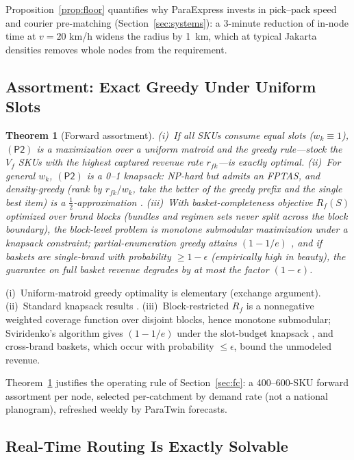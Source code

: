 \documentclass[journal]{IEEEtran}
\newtheorem{theorem}{Theorem}
\begin{document}
Proposition~\ref{prop:floor} quantifies why ParaExpress invests in pick--pack speed and courier pre-matching (Section~\ref{sec:systems}): a 3-minute reduction of in-node time at $v = 20$ km/h widens the radius by 1~km, which at typical Jakarta densities removes whole nodes from the requirement.

\subsection{Assortment: Exact Greedy Under Uniform Slots}

\begin{theorem}[Forward assortment]
\label{thm:assortment}
(i)~If all SKUs consume equal slots ($w_k \equiv 1$), $(\mathsf{P2})$ is a maximization over a uniform matroid and the greedy rule---stock the $V_f$ SKUs with the highest captured revenue rate $r_{fk}$---is \emph{exactly optimal}.
(ii)~For general $w_k$, $(\mathsf{P2})$ is a 0--1 knapsack: NP-hard but admits an FPTAS, and density-greedy (rank by $r_{fk}/w_k$, take the better of the greedy prefix and the single best item) is a $\tfrac12$-approximation \cite{knapsack}.
(iii)~With basket-completeness objective $R_f(S)$ optimized over brand blocks (bundles and regimen sets never split across the block boundary), the block-level problem is monotone submodular maximization under a knapsack constraint; partial-enumeration greedy attains $(1-1/e)$ \cite{sviridenko}, and if baskets are single-brand with probability $\ge 1 - \epsilon$ (empirically high in beauty), the guarantee on full basket revenue degrades by at most the factor $(1-\epsilon)$.
\end{theorem}
\begin{IEEEproof}
(i)~Uniform-matroid greedy optimality is elementary (exchange argument). (ii)~Standard knapsack results \cite{knapsack}. (iii)~Block-restricted $R_f$ is a nonnegative weighted coverage function over disjoint blocks, hence monotone submodular; Sviridenko's algorithm gives $(1-1/e)$ under the slot-budget knapsack \cite{sviridenko}, and cross-brand baskets, which occur with probability $\le \epsilon$, bound the unmodeled revenue.
\end{IEEEproof}

Theorem~\ref{thm:assortment} justifies the operating rule of Section~\ref{sec:fc}: a 400--600-SKU forward assortment per node, selected per-catchment by demand rate (not a national planogram), refreshed weekly by ParaTwin forecasts.

\subsection{Real-Time Routing Is Exactly Solvable}
\end{document}
